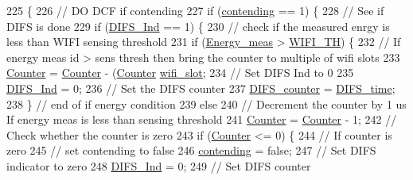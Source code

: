 \begin{DoxyCode}
225                    \{
226     \textcolor{comment}{// DO DCF if contending}
227     \textcolor{keywordflow}{if} (\hyperlink{classSTA_ad4226c80ad37062f9648438bce828089}{contending} == 1) \{
228         \textcolor{comment}{// See if DIFS is done}
229         \textcolor{keywordflow}{if} (\hyperlink{classSTA_a4afbf4650f847e15efbacec896f73f73}{DIFS\_Ind} == 1) \{
230             \textcolor{comment}{// check if the measured enrgy is less than WIFI sensing threshold}
231             \textcolor{keywordflow}{if} (\hyperlink{classSTA_a3d52251caf1e4b973bf795dcf8c2fafa}{Energy\_meas} > \hyperlink{classSTA_a4cf7f03951b6bf6263b55c5ff4f28f4c}{WIFI\_TH}) \{
232                 \textcolor{comment}{// If energy meas id > sens thresh then bring the counter to multiple of wifi slots}
233                 \hyperlink{classSTA_ac8a769972c9e523e988f60c75254d215}{Counter} = \hyperlink{classSTA_ac8a769972c9e523e988f60c75254d215}{Counter} - (\hyperlink{classSTA_ac8a769972c9e523e988f60c75254d215}{Counter} %
      \hyperlink{classSTA_a376c698ac01f5368b7e218609caa1a5a}{wifi\_slot};
234                 \textcolor{comment}{// Set DIFS Ind to 0}
235                 \hyperlink{classSTA_a4afbf4650f847e15efbacec896f73f73}{DIFS\_Ind} = 0;
236                 \textcolor{comment}{// Set the DIFS counter}
237                 \hyperlink{classSTA_a94200f37027c90163adc2cee2c502a90}{DIFS\_counter} = \hyperlink{classSTA_a156a07b07e16882d60b93571b8e3cd21}{DIFS\_time};
238             \} \textcolor{comment}{// end of if energy condition}
239             \textcolor{keywordflow}{else}
240                 \textcolor{comment}{// Decrement the counter by 1 us If energy meas is less than sensing threshold}
241                 \hyperlink{classSTA_ac8a769972c9e523e988f60c75254d215}{Counter} = \hyperlink{classSTA_ac8a769972c9e523e988f60c75254d215}{Counter} - 1;
242             \textcolor{comment}{// Check whether the counter is zero}
243             \textcolor{keywordflow}{if} (\hyperlink{classSTA_ac8a769972c9e523e988f60c75254d215}{Counter} <= 0) \{
244                 \textcolor{comment}{// If counter is zero}
245                 \textcolor{comment}{// set contending to false}
246                 \hyperlink{classSTA_ad4226c80ad37062f9648438bce828089}{contending} = \textcolor{keyword}{false};
247                 \textcolor{comment}{// Set DIFS indicator to zero}
248                 \hyperlink{classSTA_a4afbf4650f847e15efbacec896f73f73}{DIFS\_Ind} = 0;
249                 \textcolor{comment}{// Set DIFS counter}

\end{DoxyCode}

